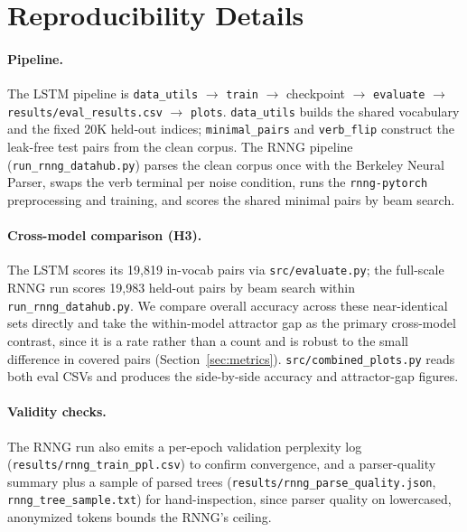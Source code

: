 \section{Reproducibility Details}
\label{app:repro}


\paragraph{Pipeline.} The LSTM pipeline is
\texttt{data\_utils} $\to$ \texttt{train} $\to$ checkpoint $\to$
\texttt{evaluate} $\to$ \texttt{results/eval\_results.csv} $\to$ \texttt{plots}.
\texttt{data\_utils} builds the shared vocabulary and the fixed 20K held-out
indices; \texttt{minimal\_pairs} and \texttt{verb\_flip} construct the leak-free
test pairs from the clean corpus. The RNNG pipeline
(\texttt{run\_rnng\_datahub.py}) parses the clean corpus once with the Berkeley
Neural Parser, swaps the verb terminal per noise condition, runs the
\texttt{rnng-pytorch} preprocessing and training, and scores the shared minimal
pairs by beam search.

\paragraph{Cross-model comparison (H3).} The LSTM scores its 19{,}819 in-vocab
pairs via \texttt{src/evaluate.py}; the full-scale RNNG run scores 19{,}983
held-out pairs by beam search within \texttt{run\_rnng\_datahub.py}. We compare
overall accuracy across these near-identical sets directly and take the
within-model attractor gap as the primary cross-model contrast, since it is a
rate rather than a count and is robust to the small difference in covered pairs
(Section~\ref{sec:metrics}). \texttt{src/combined\_plots.py} reads both eval
CSVs and produces the side-by-side accuracy and attractor-gap figures.

\paragraph{Validity checks.} The RNNG run also emits a per-epoch validation
perplexity log (\texttt{results/rnng\_train\_ppl.csv}) to confirm convergence,
and a parser-quality summary plus a sample of parsed trees
(\texttt{results/rnng\_parse\_quality.json}, \texttt{rnng\_tree\_sample.txt}) for
hand-inspection, since parser quality on lowercased, anonymized tokens bounds the
RNNG's ceiling.

